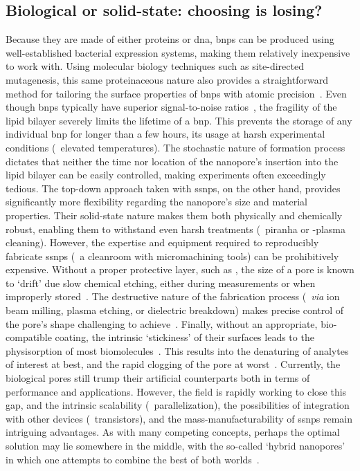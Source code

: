 \subsection{Biological or solid-state: choosing is losing?}
%

Because they are made of either proteins or \gls{dna}, \glspl{bnp} can be produced using well-established
bacterial expression systems, making them relatively inexpensive to work with. Using molecular biology
techniques such as site-directed mutagenesis, this same proteinaceous nature also provides a straightforward
method for tailoring the surface properties of \glspl{bnp} with atomic
precision~\cite{Howorka-2001,RinconRestrepo-2011}. Even though \glspl{bnp} typically have superior
signal-to-noise ratios~\cite{Fragasso-2020}, the fragility of the lipid bilayer severely limits the lifetime
of a \gls{bnp}. This prevents the storage of any individual \gls{bnp} for longer than a few hours, its usage
at harsh experimental conditions (\eg~elevated temperatures). The stochastic nature of formation process
dictates that neither the time nor location of the nanopore's insertion into the lipid bilayer can be easily
controlled, making experiments often exceedingly tedious. The top-down approach taken with \glspl{ssnp}, on
the other hand, provides significantly more flexibility regarding the nanopore's size and material properties.
Their solid-state nature makes them both physically and chemically robust, enabling them to withstand even
harsh treatments (\eg~piranha or -plasma cleaning). However, the expertise and equipment required to
reproducibly fabricate \glspl{ssnp} (\ie~a cleanroom with micromachining tools) can be prohibitively
expensive. Without a proper protective layer, such as , the size of a  pore is known to
`drift' due slow chemical etching, either during measurements or when improperly stored~\cite{Chou-2020}. The
destructive nature of the fabrication process (\eg~\textit{via} ion beam milling, plasma etching, or
dielectric breakdown) makes precise control of the pore's shape challenging to achieve~\cite{vandenHout-2010}.
Finally, without an appropriate, bio-compatible coating, the intrinsic `stickiness' of their surfaces leads to
the physisorption of most biomolecules~\cite{Eggenberger-2019,Awasthi-2020}. This results into the denaturing
of analytes of interest at best, and the rapid clogging of the pore at worst~\cite{Yusko-2011}. Currently, the
biological pores still trump their artificial counterparts both in terms of performance and applications.
However, the field is rapidly working to close this gap, and the intrinsic scalability (\eg~parallelization),
the possibilities of integration with other devices (\eg~transistors), and the mass-manufacturability of
\glspl{ssnp} remain intriguing advantages. As with many competing concepts, perhaps the optimal solution may
lie somewhere in the middle, with the so-called `hybrid nanopores' in which one attempts to combine the best
of both worlds~\cite{Hall-2010,Im-2010,Cai-2018}.

